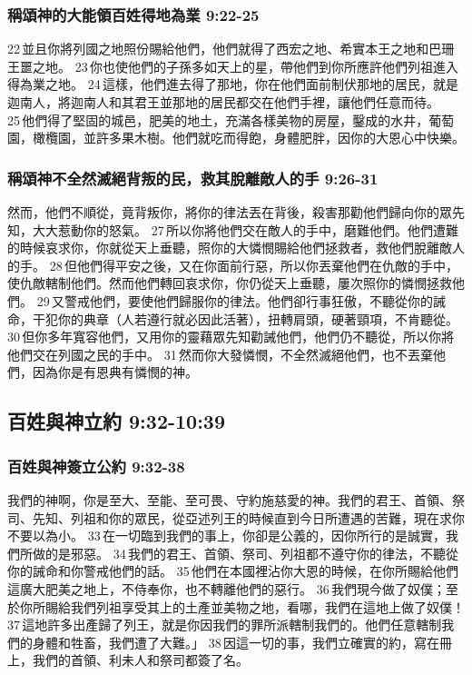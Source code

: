 \subsubsection{稱頌神的大能領百姓得地為業 9:22-25}
22 並且你將列國之地照份賜給他們，他們就得了西宏之地、希實本王之地和巴珊王噩之地。 23 你也使他們的子孫多如天上的星，帶他們到你所應許他們列祖進入得為業之地。 24 這樣，他們進去得了那地，你在他們面前制伏那地的居民，就是迦南人，將迦南人和其君王並那地的居民都交在他們手裡，讓他們任意而待。 25 他們得了堅固的城邑，肥美的地土，充滿各樣美物的房屋，鑿成的水井，葡萄園，橄欖園，並許多果木樹。他們就吃而得飽，身體肥胖，因你的大恩心中快樂。

\subsubsection{稱頌神不全然滅絕背叛的民，救其脫離敵人的手 9:26-31}
然而，他們不順從，竟背叛你，將你的律法丟在背後，殺害那勸他們歸向你的眾先知，大大惹動你的怒氣。 27 所以你將他們交在敵人的手中，磨難他們。他們遭難的時候哀求你，你就從天上垂聽，照你的大憐憫賜給他們拯救者，救他們脫離敵人的手。 28 但他們得平安之後，又在你面前行惡，所以你丟棄他們在仇敵的手中，使仇敵轄制他們。然而他們轉回哀求你，你仍從天上垂聽，屢次照你的憐憫拯救他們。 29 又警戒他們，要使他們歸服你的律法。他們卻行事狂傲，不聽從你的誡命，干犯你的典章（人若遵行就必因此活著），扭轉肩頭，硬著頸項，不肯聽從。 30 但你多年寬容他們，又用你的靈藉眾先知勸誡他們，他們仍不聽從，所以你將他們交在列國之民的手中。 31 然而你大發憐憫，不全然滅絕他們，也不丟棄他們，因為你是有恩典有憐憫的神。

\subsection{百姓與神立約 9:32-10:39}
\subsubsection{百姓與神簽立公約 9:32-38}
我們的神啊，你是至大、至能、至可畏、守約施慈愛的神。我們的君王、首領、祭司、先知、列祖和你的眾民，從亞述列王的時候直到今日所遭遇的苦難，現在求你不要以為小。 33 在一切臨到我們的事上，你卻是公義的，因你所行的是誠實，我們所做的是邪惡。 34 我們的君王、首領、祭司、列祖都不遵守你的律法，不聽從你的誡命和你警戒他們的話。 35 他們在本國裡沾你大恩的時候，在你所賜給他們這廣大肥美之地上，不侍奉你，也不轉離他們的惡行。 36 我們現今做了奴僕；至於你所賜給我們列祖享受其上的土產並美物之地，看哪，我們在這地上做了奴僕！ 37 這地許多出產歸了列王，就是你因我們的罪所派轄制我們的。他們任意轄制我們的身體和牲畜，我們遭了大難。」 38 因這一切的事，我們立確實的約，寫在冊上，我們的首領、利未人和祭司都簽了名。

